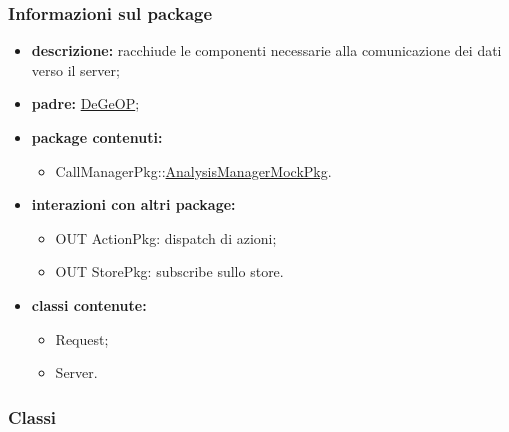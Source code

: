 \subsubsection{Informazioni sul package}
\begin{itemize}
	\item \textbf{descrizione:} racchiude le componenti necessarie alla comunicazione dei dati verso il server;
	\item \textbf{padre:} \hyperref[pkg::DeGeOP]{DeGeOP};
	\item \textbf{package contenuti:}
	\begin{itemize}
		\item CallManagerPkg::\hyperref[pkg::AnalysisManagerMockPkg]{AnalysisManagerMockPkg}.
	\end{itemize}
	\item \textbf{interazioni con altri package:} 
	\begin{itemize}
		\item OUT ActionPkg: dispatch di azioni;
		\item OUT StorePkg: subscribe sullo store.
	\end{itemize}
	\item \textbf{classi contenute:}
	\begin{itemize}
		\item Request;
		\item Server.
	\end{itemize}
\end{itemize}
\subsubsection{Classi}

